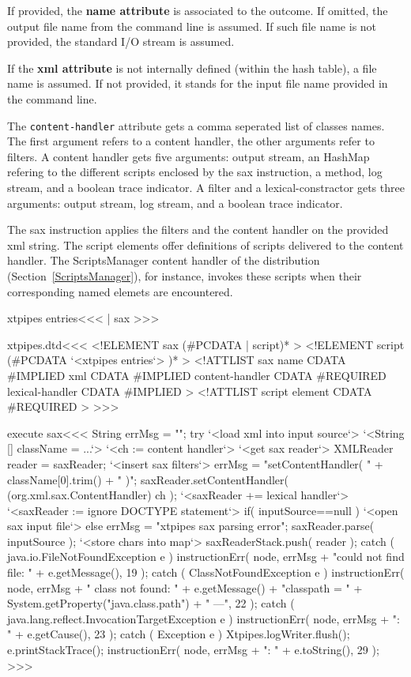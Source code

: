 \documentclass{article}
\begin{document}
{If provided, the {\bf name attribute} is associated to the outcome.
If omitted, the output file name from the command line is assumed. If
such file name is not provided, the standard I/O stream is assumed.

If the {\bf xml attribute} is not internally defined (within the hash
table), a file name is assumed.  If not provided, it stands for the
input file name provided in the command line.

The \verb+content-handler+ attribute gets a comma seperated list of
classes names. The first argument refers to a content handler, the
other arguments refer to filters. A content handler gets five
arguments: output stream, an HashMap refering to the different scripts
enclosed by the sax instruction, a method, log stream, and a boolean
trace indicator.  A filter and a lexical-constractor gets three
arguments: output stream, log stream, and a boolean trace indicator.

The sax instruction applies the filters and the content handler on the
provided xml string.  The script elements offer definitions of scripts
delivered to the content handler. The ScriptsManager content handler
of the distribution (Section~\ref{ScriptsManager}), for instance,
invokes these scripts when their corresponding named elemets are
encountered.


\<xtpipes entries\><<<
| sax
>>>


\<xtpipes.dtd\><<<
<!ELEMENT sax (#PCDATA | script)*  >
<!ELEMENT script (#PCDATA `<xtpipes entries`> )*  >
<!ATTLIST sax
          name            CDATA #IMPLIED
          xml             CDATA #IMPLIED
          content-handler CDATA #REQUIRED
          lexical-handler CDATA #IMPLIED
>
<!ATTLIST script
          element CDATA #REQUIRED
>
>>>

\<execute sax\><<<
String errMsg = "";
try{
   `<load xml into input source`>
   `<String [] className = ...`>
   `<ch := content handler`>
   `<get sax reader`>
   XMLReader reader = saxReader;
   `<insert sax filters`>
   errMsg = "setContentHandler( "
            + className[0].trim() + " )";
   saxReader.setContentHandler( (org.xml.sax.ContentHandler) ch );
   `<saxReader += lexical handler`>
   `<saxReader := ignore DOCTYPE statement`>
   if( inputSource==null ){
       `<open sax input file`>
   } else {
       errMsg = "xtpipes sax parsing error";
       saxReader.parse( inputSource );
   }
   `<store chars into map`>
   saxReaderStack.push( reader );
} catch ( java.io.FileNotFoundException e ){
   instructionErr( node, errMsg
                   + "could not find file: " + e.getMessage(), 19 );
} catch ( ClassNotFoundException e ){
   instructionErr( node, errMsg
                   + " class not found: "
                   + e.getMessage() + "\n classpath = "
                   + System.getProperty("java.class.path")
                   + " ---", 22 );
} catch ( java.lang.reflect.InvocationTargetException e ){
   instructionErr( node, errMsg + ": " + e.getCause(), 23 );
} catch ( Exception e ){
   Xtpipes.logWriter.flush();
   e.printStackTrace();
   instructionErr( node, errMsg + ": " + e.toString(), 29 );
}
>>>

}
\end{document}
